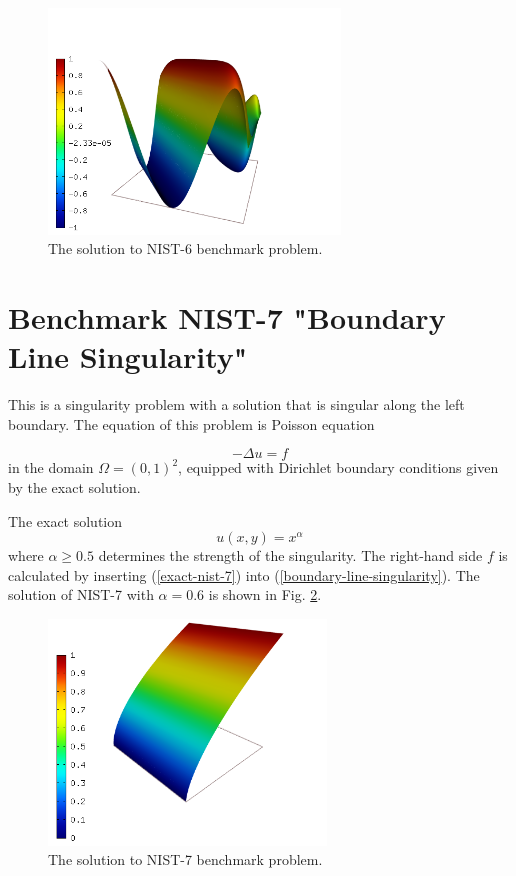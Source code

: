 \documentclass[12pt]{elsarticle}
\begin{document}
\begin{figure}[!ht]
\centering
\includegraphics[height=6cm]{nist/nist-6/solution.png}
\caption{The solution to NIST-6 benchmark problem.}
\label{fig:sln-nist06}
\end{figure}

\section{Benchmark NIST-7 "Boundary Line Singularity"}
\label{sec:bench-7}

This is a singularity problem with a solution that is singular along the left boundary.
The equation of this problem is Poisson equation

\begin{equation} \label{boundary-line-singularity}
-\Delta u = f
\end{equation}
in the domain $\Omega = (0, 1)^2$, equipped with Dirichlet boundary conditions
given by the exact solution.

The exact solution
\begin{equation}\label{exact-nist-7}
u(x,y) = x^{\alpha}
\end{equation}
where $\alpha \geq 0.5$ determines the strength of the singularity.
The right-hand side $f$ is calculated by inserting (\ref{exact-nist-7}) into (\ref{boundary-line-singularity}).
The solution of NIST-7 with $\alpha = 0.6$ is shown in Fig. \ref{fig:sln-nist07}.

\begin{figure}[!ht]
\centering
\includegraphics[height=6cm]{nist/nist-7/solution.png}
\caption{The solution to NIST-7 benchmark problem.}
\label{fig:sln-nist07}
\end{figure}
\end{document}

